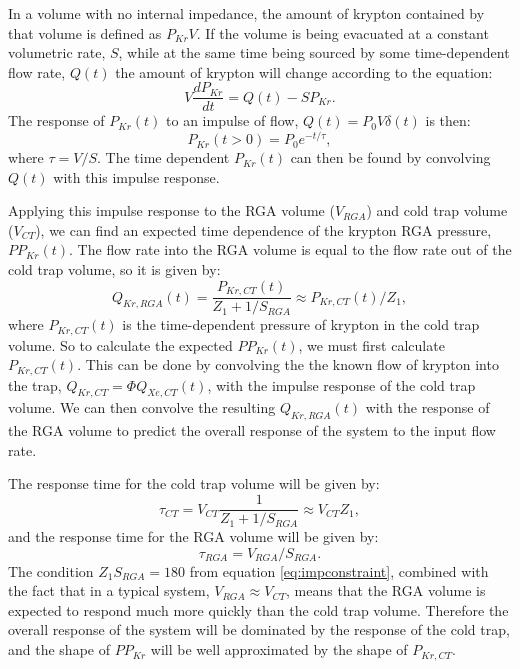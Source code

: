 \documentclass[12pt]{article}
\begin{document}
In a volume with no internal impedance, the amount of krypton contained by that volume is defined as $P_{Kr}V$. If the volume is being evacuated at a constant volumetric rate, $S$, while at the same time being sourced by some time-dependent flow rate, $Q(t)$ the amount of krypton will change according to the equation:
\begin{equation}
\label{eq:expdiff}
V\frac{dP_{Kr}}{dt}=Q(t)-SP_{Kr}.
\end{equation}
The response of $P_{Kr}(t)$ to an impulse of flow, $Q(t)=P_0V\delta(t)$ is then:
\begin{equation}
P_{Kr}(t>0)=P_0e^{-t/\tau},
\end{equation}
where $\tau = V/S$. The time dependent $P_{Kr}(t)$ can then be found by convolving $Q(t)$ with this impulse response.

Applying this impulse response to the RGA volume ($V_{RGA}$) and cold trap volume ($V_{CT}$), we can find an expected time dependence of the krypton RGA pressure, $PP_{Kr}(t)$. The flow rate into the RGA volume is equal to the flow rate out of the cold trap volume, so it is given by:
\begin{equation}
Q_{Kr,RGA}(t)=\frac{P_{Kr,CT}(t)}{Z_1+1/S_{RGA}}\approx P_{Kr,CT}(t)/Z_1,
\end{equation}
where $P_{Kr,CT}(t)$ is the time-dependent pressure of krypton in the cold trap volume. So to calculate the expected $PP_{Kr}(t)$, we must first calculate $P_{Kr,CT}(t)$. This can be done by convolving the the known flow of krypton into the trap, $Q_{Kr,CT}=\Phi Q_{Xe,CT}(t)$, with the impulse response of the cold trap volume. We can then convolve the resulting $Q_{Kr,RGA}(t)$ with the response of the RGA volume to predict the overall response of the system to the input flow rate. 

The response time for the cold trap volume will be given by:
\begin{equation}
\tau_{CT}=V_{CT}\frac{1}{Z_1+1/S_{RGA}} \approx V_{CT}Z_1,
\label{eq:CTtime}
\end{equation}
and the response time for the RGA volume will be given by:
\begin{equation}
\tau_{RGA}=V_{RGA}/S_{RGA}.
\end{equation}
The condition $Z_1S_{RGA}=180$ from equation \ref{eq:impconstraint}, combined with the fact that in a typical system, $V_{RGA}\approx V_{CT}$, means that the RGA volume is expected to respond much more quickly than the cold trap volume. Therefore the overall response of the system will be dominated by the response of the cold trap, and the shape of $PP_{Kr}$ will be well approximated by the shape of $P_{Kr,CT}$.
\end{document}
